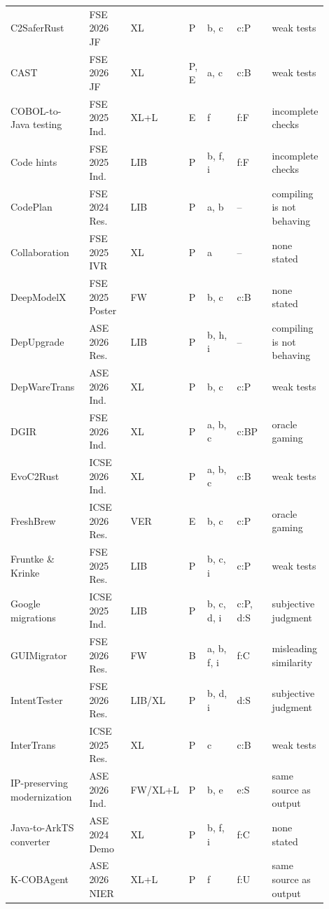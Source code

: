 \begin{table}[p]
\begin{tabular}{@{}P{0.22\linewidth} P{0.14\linewidth} P{0.08\linewidth} P{0.05\linewidth} P{0.12\linewidth} P{0.12\linewidth} P{0.17\linewidth}@{}}
    C2SaferRust~\cite{c2saferrust} & FSE 2026 JF & XL & P & b, c & c:P & weak tests \\
    CAST~\cite{cast} & FSE 2026 JF & XL & P, E & a, c & c:B & weak tests \\
    COBOL-to-Java testing~\cite{coboljava} & FSE 2025 Ind. & XL+L & E & f & f:F & incomplete checks \\
    Code hints~\cite{codehints} & FSE 2025 Ind. & LIB & P & b, f, i & f:F & incomplete checks \\
    CodePlan~\cite{codeplan} & FSE 2024 Res. & LIB & P & a, b & -- & compiling is not behaving \\
    Collaboration~\cite{collaboration} & FSE 2025 IVR & XL & P & a & -- & none stated \\
    DeepModelX~\cite{deepmodelx} & FSE 2025 Poster & FW & P & b, c & c:B & none stated \\
    DepUpgrade~\cite{depupgrade} & ASE 2026 Res. & LIB & P & b, h, i & -- & compiling is not behaving \\
    DepWareTrans~\cite{depwaretrans} & ASE 2026 Ind. & XL & P & b, c & c:P & weak tests \\
    DGIR~\cite{dgir} & FSE 2026 Ind. & XL & P & a, b, c & c:BP & oracle gaming \\
    EvoC2Rust~\cite{evoc2rust} & ICSE 2026 Ind. & XL & P & a, b, c & c:B & weak tests \\
    FreshBrew~\cite{freshbrew} & ICSE 2026 Res. & VER & E & b, c & c:P & oracle gaming \\
    Fruntke \& Krinke~\cite{fruntke} & FSE 2025 Res. & LIB & P & b, c, i & c:P & weak tests \\
    Google migrations~\cite{googlemig} & ICSE 2025 Ind. & LIB & P & b, c, d, i & c:P, d:S & subjective judgment \\
    GUIMigrator~\cite{guimigrator} & FSE 2026 Res. & FW & B & a, b, f, i & f:C & misleading similarity \\
    IntentTester~\cite{intenttester} & FSE 2026 Res. & LIB/XL & P & b, d, i & d:S & subjective judgment \\
    InterTrans~\cite{intertrans} & ICSE 2025 Res. & XL & P & c & c:B & weak tests \\
    IP-preserving modernization~\cite{ipmodern} & ASE 2026 Ind. & FW/XL+L & P & b, e & e:S & same source as output \\
    Java-to-ArkTS converter~\cite{arkts} & ASE 2024 Demo & XL & P & b, f, i & f:C & none stated \\
    K-COBAgent~\cite{kcobagent} & ASE 2026 NIER & XL+L & P & f & f:U & same source as output \\

\end{tabular}
\end{table}
